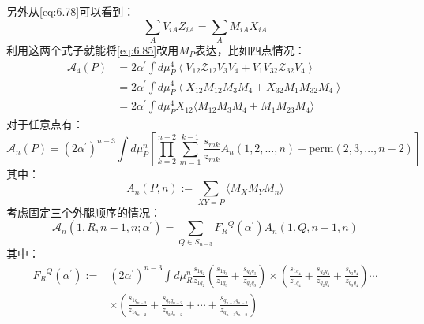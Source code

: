 另外从\ref{eq:6.78}可以看到：
\begin{equation}
	\sum_AV_{iA}Z_{iA}=\sum_AM_{iA}X_{iA}
\end{equation}
利用这两个式子就能将\ref{eq:6.85}改用$M_P$表达，比如四点情况：
\begin{equation}
\begin{aligned}
		\mathcal{A}_4(P)&=2\alpha^{\prime}\int d\mu_P^4\left\langle V_{12}\mathcal{Z}_{12}V_3V_4+V_1V_{32}\mathcal{Z}_{32}V_4\right\rangle\\
	&=2\alpha^{\prime}\int d\mu_{P}^{4}\left\langle X_{12}M_{12}M_{3}M_{4}+X_{32}M_{1}M_{32}M_{4}\right\rangle\\
	&=2\alpha^{\prime}\int d\mu_P^4X_{12}\langle M_{12}M_3M_4+M_1M_{23}M_4\rangle
\end{aligned}
\end{equation}
对于任意点有：
\begin{equation}
\boxed{
		\mathcal{A}_n(P)=(2\alpha^{\prime})^{n-3}\int d\mu_P^n\left[\prod_{k=2}^{n-2}\sum_{m=1}^{k-1}\frac{s_{mk}}{z_{mk}}A_n(1,2,\ldots,n)+\mathrm{perm}(2,3,\ldots,n-2)\right]
}
\end{equation}
其中：
\begin{equation}
	\label{eq:6.96}
\boxed{
		A_n(P,n):=\sum_{XY=P}\langle M_XM_YM_n\rangle
}
\end{equation}
考虑固定三个外腿顺序的情况：
\begin{equation}
	\mathcal{A}_n(1,R,n-1,n;\alpha^{\prime})=\sum_{{Q}\in S_{n-3}}{{F}_R}^{Q}(\alpha^{\prime})A_n(1,{Q},n-1,n)
\end{equation}
其中：
\begin{equation}
\begin{aligned}
	\label{eq:6.98}
		{F_R}^Q(\alpha^{\prime}):=&(2\alpha^{\prime})^{n-3}\int d\mu_R^n\frac{s_{1q_2}}{z_{1q_2}}\left(\frac{s_{1q_3}}{z_{1q_3}}+\frac{s_{q_2q_3}}{z_{q_2q_3}}\right)
	\times\left(\frac{s_{1q_4}}{z_{1q_4}}+\frac{s_{q_2q_4}}{z_{q_2q_4}}+\frac{s_{q_3q_4}}{z_{q_3q_4}}\right)\cdots\\
	&\times\left(\frac{s_{1q_{n-2}}}{z_{1q_{n-2}}}+\frac{s_{q_2q_{n-2}}}{z_{q_2q_{n-2}}}+\cdots+\frac{s_{q_{n-3}q_{n-2}}}{z_{q_{n-3}q_{n-2}}}\right)
\end{aligned}
\end{equation}
